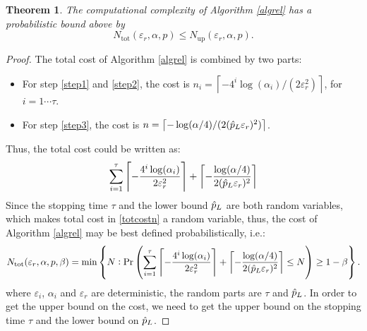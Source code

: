 \documentclass{iitthesis}
\newtheorem{theorem}{Theorem}[section]
\begin{document}
\begin{theorem} \label{costupperboundrel}
The computational complexity of Algorithm \ref{algrel} has a probabilistic bound above by $$N_{\text{tot}}(\varepsilon_r,\alpha,p) \leq N_{\text{up}}(\varepsilon_r,\alpha,p).$$
\end{theorem}
\begin{proof}
The total cost of Algorithm \ref{algrel} is combined by two parts:
\begin{itemize}
\item For step \ref{step1} and \ref{step2}, the cost is $n_i = \left \lceil -4^i \log\left ( \alpha_i \right)/(2\varepsilon_r^2) \right \rceil$, for $i = 1 \cdots \tau$.
\item For step \ref{step3}, the cost is $n= \left \lceil -\log (\alpha/4)/(2  (\hat{p}_L \varepsilon_{r})^2)\right \rceil $. 
\end{itemize}
Thus, the total cost could be written as: 
\begin{align}\label{totcostn}
\sum_{i=1}^{\tau} \left \lceil -\frac{4^i \log(\alpha_i)} {2\varepsilon_r^2 } \right\rceil+\left \lceil -\frac{\log (\alpha/4)}{2  (\hat{p}_L \varepsilon_{r})^2} \right \rceil
\end{align}
Since the stopping time $\tau$ and the lower bound $\hat{p}_L$ are both random variables, which makes total cost in \eqref{totcostn} a random variable, thus, the cost of Algorithm \ref{algrel} may be best defined probabilistically, i.e.:
$$N_{\text{tot}}(\varepsilon_r, \alpha,p,\beta)= \min\left \{N: \Pr\left (\sum_{i=1}^{\tau} \left \lceil -\frac{4^i \log(\alpha_i)} {2\varepsilon_r^2 } \right\rceil+\left \lceil -\frac{\log (\alpha/4)}{2  (\hat{p}_L \varepsilon_{r})^2} \right \rceil \leq N\right) \geq 1-\beta \right \}.$$
where $\varepsilon_i$, $\alpha_i$ and $\varepsilon_r$ are deterministic, the random parts are $\tau$ and $\hat{p}_{L}$. In order to get the upper bound on the cost, we need to get the upper bound on the stopping time $\tau$ and the lower bound on $\hat{p}_L$.


\end{proof}
\end{document}
